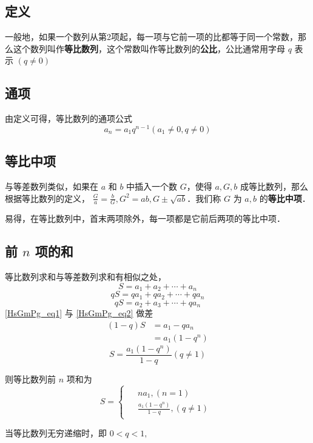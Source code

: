 
\begin{issues}
\issueDraft
\end{issues}

\subsection{定义}
一般地，如果一个数列从第2项起，每一项与它前一项的比都等于同一个常数，那么这个数列叫作\textbf{等比数列}，这个常数叫作等比数列的\textbf{公比}，公比通常用字母 $q$ 表示 $(q\ne 0)$

\subsection{通项}
由定义可得，等比数列的通项公式
\begin{equation}
a_n = a_1 q^{n-1}(a_1 \ne 0,q\ne 0)
\end{equation}

\subsection{等比中项}
与等差数列类似，如果在 $a$ 和 $b$ 中插入一个数 $G$，使得 $a,G,b$ 成等比数列，那么根据等比数列的定义， $\frac{G}{a} = \frac{b}{G},G^2 = ab,G \pm \sqrt{ab}$．我们称 $G$ 为 $a,b$ 的\textbf{等比中项}．

易得，在等比数列中，首末两项除外，每一项都是它前后两项的等比中项．

\subsection{前 $n$ 项的和}
等比数列求和与等差数列求和有相似之处，
\begin{equation}\label{HsGmPg_eq1}
S = a_1 + a_2 + \cdots + a_n
\end{equation}
\begin{equation}
qS = qa_1 + qa_2 + \cdots + qa_n
\end{equation}
\begin{equation}\label{HsGmPg_eq2}
qS= a_2 + a_3 + \cdots + qa_n
\end{equation}
\autoref{HsGmPg_eq1} 与 \autoref{HsGmPg_eq2} 做差
\begin{equation}
\begin{aligned}
(1 - q)S &= a_1 - qa_n\\
&= a_1(1 - q^n)
\end{aligned}
\end{equation}
\begin{equation}
S = \frac{a_1(1-q^n)}{1-q}(q\neq 1)
\end{equation}

则等比数列前 $n$ 项和为
\begin{equation}
S = 
\begin{cases}
\begin{aligned}
&na_1,(n = 1) \\
&\frac{a_1(1-q^n)}{1-q},(q \neq 1)
\end{aligned}
\end{cases}
\end{equation}

当等比数列无穷递缩时，即 $0<q<1,$